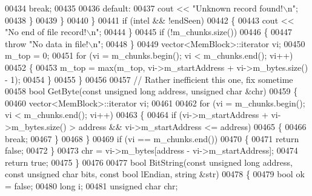 \begin{DoxyCode}
{{{{{{{{{{{{{{{{{00434                     \textcolor{keywordflow}{break};
00435 
00436                 \textcolor{keywordflow}{default}:
00437                     cout << \textcolor{stringliteral}{"Unknown record found!\(\backslash\)n"};
00438                 \}
00439             \}
00440         \}
00441         \textcolor{keywordflow}{if} (intel && !endSeen)
00442         \{
00443             cout << \textcolor{stringliteral}{"No end of file record!\(\backslash\)n"};
00444         \}
00445         \textcolor{keywordflow}{if} (!m\_chunks.size())
00446         \{
00447             \textcolor{keywordflow}{throw} \textcolor{stringliteral}{"No data in file!\(\backslash\)n"};
00448         \}
00449         vector<MemBlock>::iterator  vi;
00450         m\_top = 0;
00451         \textcolor{keywordflow}{for} (vi = m\_chunks.begin(); vi < m\_chunks.end(); vi++)
00452         \{
00453             m\_top = max(m\_top, vi->m\_startAddress + vi->m\_bytes.size() - 1);
00454         \}
00455     \}
00456 
00457     \textcolor{comment}{// Rather inefficient this one, fix sometime}
00458     \textcolor{keywordtype}{bool} GetByte(\textcolor{keyword}{const} \textcolor{keywordtype}{unsigned} \textcolor{keywordtype}{long} address, \textcolor{keywordtype}{unsigned} \textcolor{keywordtype}{char} &chr)
00459     \{
00460         vector<MemBlock>::iterator  vi;
00461 
00462         \textcolor{keywordflow}{for} (vi = m\_chunks.begin(); vi < m\_chunks.end(); vi++)
00463         \{
00464             \textcolor{keywordflow}{if} (vi->m\_startAddress + vi->m\_bytes.size() > address && vi->m\_startAddress <= 
      address)
00465             \{
00466                 \textcolor{keywordflow}{break};
00467             \}
00468         \}
00469         \textcolor{keywordflow}{if} (vi == m\_chunks.end())
00470         \{
00471             \textcolor{keywordflow}{return} \textcolor{keyword}{false};
00472         \}
00473         chr = vi->m\_bytes[address - vi->m\_startAddress];
00474         \textcolor{keywordflow}{return} \textcolor{keyword}{true};
00475     \}
00476 
00477     \textcolor{keywordtype}{bool} BitString(\textcolor{keyword}{const} \textcolor{keywordtype}{unsigned} \textcolor{keywordtype}{long} address, \textcolor{keyword}{const} \textcolor{keywordtype}{unsigned} \textcolor{keywordtype}{char} bits, \textcolor{keyword}{const} \textcolor{keywordtype}{bool} lEndian, \textcolor{keywordtype}{string} &str)
00478     \{
00479         \textcolor{keywordtype}{bool}            ok = \textcolor{keyword}{false};
00480         \textcolor{keywordtype}{long}            i;
00481         \textcolor{keywordtype}{unsigned} \textcolor{keywordtype}{char}   chr;
}}}}}}}}}}}}}}}}}
\end{DoxyCode}
